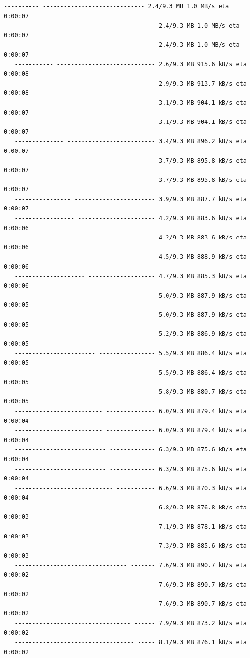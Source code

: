 \documentclass[11pt]{article}
\begin{document}
\begin{Verbatim}[commandchars=\\\{\}]
   ---------- ----------------------------- 2.4/9.3 MB 1.0 MB/s eta 0:00:07
   ---------- ----------------------------- 2.4/9.3 MB 1.0 MB/s eta 0:00:07
   ---------- ----------------------------- 2.4/9.3 MB 1.0 MB/s eta 0:00:07
   ----------- ---------------------------- 2.6/9.3 MB 915.6 kB/s eta 0:00:08
   ------------ --------------------------- 2.9/9.3 MB 913.7 kB/s eta 0:00:08
   ------------- -------------------------- 3.1/9.3 MB 904.1 kB/s eta 0:00:07
   ------------- -------------------------- 3.1/9.3 MB 904.1 kB/s eta 0:00:07
   -------------- ------------------------- 3.4/9.3 MB 896.2 kB/s eta 0:00:07
   --------------- ------------------------ 3.7/9.3 MB 895.8 kB/s eta 0:00:07
   --------------- ------------------------ 3.7/9.3 MB 895.8 kB/s eta 0:00:07
   ---------------- ----------------------- 3.9/9.3 MB 887.7 kB/s eta 0:00:07
   ----------------- ---------------------- 4.2/9.3 MB 883.6 kB/s eta 0:00:06
   ----------------- ---------------------- 4.2/9.3 MB 883.6 kB/s eta 0:00:06
   ------------------- -------------------- 4.5/9.3 MB 888.9 kB/s eta 0:00:06
   -------------------- ------------------- 4.7/9.3 MB 885.3 kB/s eta 0:00:06
   --------------------- ------------------ 5.0/9.3 MB 887.9 kB/s eta 0:00:05
   --------------------- ------------------ 5.0/9.3 MB 887.9 kB/s eta 0:00:05
   ---------------------- ----------------- 5.2/9.3 MB 886.9 kB/s eta 0:00:05
   ----------------------- ---------------- 5.5/9.3 MB 886.4 kB/s eta 0:00:05
   ----------------------- ---------------- 5.5/9.3 MB 886.4 kB/s eta 0:00:05
   ------------------------ --------------- 5.8/9.3 MB 880.7 kB/s eta 0:00:05
   ------------------------- -------------- 6.0/9.3 MB 879.4 kB/s eta 0:00:04
   ------------------------- -------------- 6.0/9.3 MB 879.4 kB/s eta 0:00:04
   -------------------------- ------------- 6.3/9.3 MB 875.6 kB/s eta 0:00:04
   -------------------------- ------------- 6.3/9.3 MB 875.6 kB/s eta 0:00:04
   ---------------------------- ----------- 6.6/9.3 MB 870.3 kB/s eta 0:00:04
   ----------------------------- ---------- 6.8/9.3 MB 876.8 kB/s eta 0:00:03
   ------------------------------ --------- 7.1/9.3 MB 878.1 kB/s eta 0:00:03
   ------------------------------- -------- 7.3/9.3 MB 885.6 kB/s eta 0:00:03
   -------------------------------- ------- 7.6/9.3 MB 890.7 kB/s eta 0:00:02
   -------------------------------- ------- 7.6/9.3 MB 890.7 kB/s eta 0:00:02
   -------------------------------- ------- 7.6/9.3 MB 890.7 kB/s eta 0:00:02
   --------------------------------- ------ 7.9/9.3 MB 873.2 kB/s eta 0:00:02
   ---------------------------------- ----- 8.1/9.3 MB 876.1 kB/s eta 0:00:02

\end{Verbatim}
\end{document}
